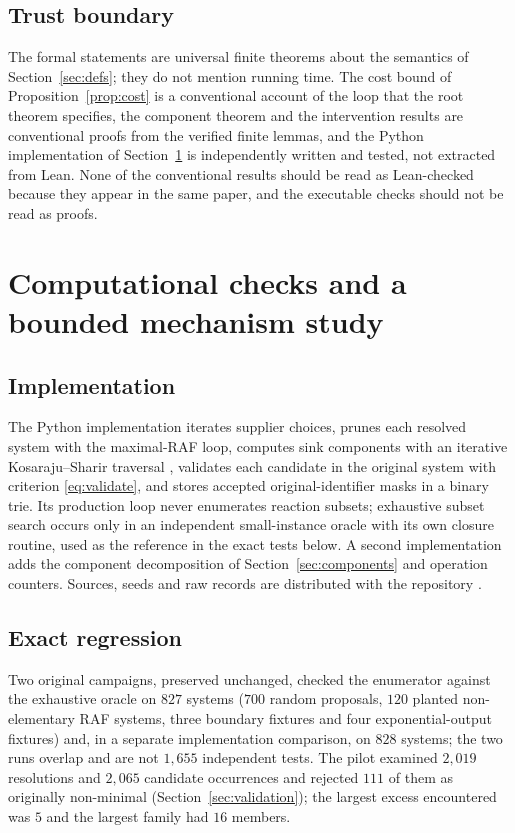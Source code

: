 \documentclass[11pt,a4paper]{article}
\theoremstyle{plain}
\theoremstyle{definition}
\theoremstyle{remark}
\begin{document}
\subsection{Trust boundary}

The formal statements are universal finite theorems about the semantics of Section~\ref{sec:defs}; they do not mention running time. The cost bound of Proposition~\ref{prop:cost} is a conventional account of the loop that the root theorem specifies, the component theorem and the intervention results are conventional proofs from the verified finite lemmas, and the Python implementation of Section~\ref{sec:experiments} is independently written and tested, not extracted from Lean. None of the conventional results should be read as Lean-checked because they appear in the same paper, and the executable checks should not be read as proofs.

\section{Computational checks and a bounded mechanism study}\label{sec:experiments}

\subsection{Implementation}

The Python implementation iterates supplier choices, prunes each resolved system with the maximal-RAF loop, computes sink components with an iterative Kosaraju--Sharir traversal \cite{sharir1981strong}, validates each candidate in the original system with criterion \eqref{eq:validate}, and stores accepted original-identifier masks in a binary trie. Its production loop never enumerates reaction subsets; exhaustive subset search occurs only in an independent small-instance oracle with its own closure routine, used as the reference in the exact tests below. A second implementation adds the component decomposition of Section~\ref{sec:components} and operation counters. Sources, seeds and raw records are distributed with the repository \cite{repository2026}.

\subsection{Exact regression}

Two original campaigns, preserved unchanged, checked the enumerator against the exhaustive oracle on $827$ systems ($700$ random proposals, $120$ planted non-elementary RAF systems, three boundary fixtures and four exponential-output fixtures) and, in a separate implementation comparison, on $828$ systems; the two runs overlap and are not $1{,}655$ independent tests. The pilot examined $2{,}019$ resolutions and $2{,}065$ candidate occurrences and rejected $111$ of them as originally non-minimal (Section~\ref{sec:validation}); the largest excess encountered was $5$ and the largest family had $16$ members.
\end{document}
